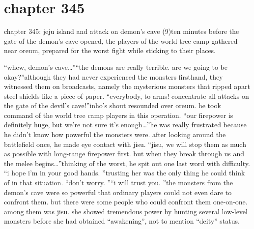 \section{chapter 345}

chapter 345: jeju island and attack on demon’s cave (9)ten minutes before the gate of the demon’s cave opened, the players of the world tree camp gathered near oreum, prepared for the worst fight while sticking to their places.





“whew, demon’s cave…”“the demons are really terrible.
 are we going to be okay?”although they had never experienced the monsters firsthand, they witnessed them on broadcasts, namely the mysterious monsters that ripped apart steel shields like a piece of paper.
“everybody, to arms! concentrate all attacks on the gate of the devil’s cave!”inho’s shout resounded over oreum.
 he took command of the world tree camp players in this operation.
“our firepower is definitely huge, but we’re not sure it’s enough…”he was really frustrated because he didn’t know how powerful the monsters were.
after looking around the battlefield once, he made eye contact with jisu.
“jisu, we will stop them as much as possible with long-range firepower first.
 but when they break through us and the melee begins…”thinking of the worst, he spit out one last word with difficulty.
“i hope i’m in your good hands.
”trusting her was the only thing he could think of in that situation.
“don’t worry.
”“i will trust you.
”the monsters from the demon’s cave were so powerful that ordinary players could not even dare to confront them.
but there were some people who could confront them one-on-one.
 among them was jisu.
 she showed tremendous power by hunting several low-level monsters before she had obtained “awakening”, not to mention “deity” status.


